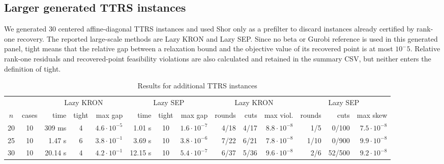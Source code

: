 \documentclass[11pt]{article}
\begin{document}
\subsection*{Larger generated TTRS instances}

\noindent We generated 30 centered affine-diagonal TTRS instances and used Shor
only as a prefilter to discard instances already certified by rank-one recovery.
The reported large-scale methods are Lazy KRON and Lazy SEP.  Since no beta or
Gurobi reference is used in this generated panel, tight means that the relative
gap between a relaxation bound and the objective value of its recovered point
is at most \(10^-5\).  Relative rank-one residuals and recovered-point
feasibility violations are also calculated and retained in the summary CSV,
but neither enters the definition of tight.


\begin{table}[htbp]
\centering
\caption{Results for additional TTRS instances}
\label{tab:TTRS_larger}
\vskip 10pt
\begingroup
\setlength{\tabcolsep}{2pt}
\small
\begin{tabular}{c c|r c r|r c r|r r r|r r r}
\hline
& &\multicolumn{3}{c|}{Lazy KRON} & \multicolumn{3}{c|}{Lazy SEP} & \multicolumn{3}{c|}{Lazy KRON} & \multicolumn{3}{c}{Lazy SEP} \\
\(n\)& cases & time &tight & max gap & time& tight & max gap & rounds & cuts & max viol. & rounds & cuts & max skew \\
\hline
20 & 10&   309 ms  &4 & $4.6\cdot 10^{-5}$ & 1.01 s   &  10 & $1.6\cdot 10^{-7}$ & 4/18 & 4/17 & $8.8\cdot 10^{-8}$ & 1/5 & 0/100 & $7.5\cdot 10^{-8}$ \\
25 & 10&   1.47 s  &6 & $3.8\cdot 10^{-1}$ & 3.69 s   &  10 & $3.8\cdot 10^{-6}$ & 7/22 & 6/21 & $7.8\cdot 10^{-8}$ & 1/10 & 0/900 & $9.9\cdot 10^{-8}$ \\
30 & 10&   20.14 s  &4 & $4.2\cdot 10^{-1}$ & 12.15 s   &  10 & $5.4\cdot 10^{-7}$ & 6/37 & 5/36 & $9.6\cdot 10^{-8}$ & 2/6 & 52/500 & $9.2\cdot 10^{-8}$ \\
\hline
\hline
\end{tabular}
\endgroup
\end{table}
\end{document}
